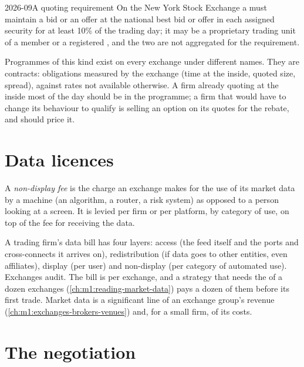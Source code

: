 \begin{dated}{2026-09}{A quoting requirement}\label{dat:m1:getting-access-equities:slp}
On the New York Stock Exchange a  must
maintain a bid or an offer at the national best bid or offer in each assigned
security for at least 10\% of the trading day; it may be a proprietary trading
unit of a member or a registered , and the two are not
aggregated for the requirement.
\end{dated}

Programmes of this kind exist on every exchange under different names.
They are contracts: obligations measured by the exchange (time at the inside,
quoted size, spread), against rates not available otherwise. A firm already
quoting at the inside most of the day should be in the programme; a firm that
would have to change its behaviour to qualify is selling an option on its
quotes for the rebate, and should price it.

\section{Data licences}

\begin{definition}\label{def:m1:getting-access-equities:nondisplay}
A \emph{non-display fee} is the charge an exchange
makes for the use of its market data by a machine (an algorithm, a router, a
risk system) as opposed to a person looking at a screen. It is levied per
firm or per platform, by category of use, on top of the fee for receiving the
data.
\end{definition}

A trading firm's data bill has four layers: access (the feed itself and the
ports and cross-connects it arrives on), redistribution (if data goes to
other entities, even affiliates), display (per user) and non-display (per
category of automated use). Exchanges audit. The bill is per exchange, and a
strategy that needs the  of a dozen exchanges
(\cref{ch:m1:reading-market-data}) pays a dozen of them before its first
trade. Market data is a significant line of an exchange group's revenue
(\cref{ch:m1:exchanges-brokers-venues}) and, for a small firm, of its costs.

\section{The negotiation}

